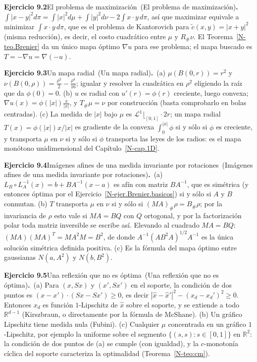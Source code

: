 \documentclass[11pt,a4paper]{amsart}
\newcommand{\R}{{\mathbb R}}
\newcommand{\LL}{{\mathcal L}}
\theoremstyle{remark}
\theoremstyle{definition}
\numberwithin{subsection}{section}
\numberwithin{equation}{section}
\newcommand{\ejlabel}[2]{\par\medskip\noindent\textbf{Ejercicio #1}\ifx\relax#2\relax\else\ (#2)\fi\textbf{.}\ }
\begin{document}
\ejlabel{9.2}{El problema de maximización}$\int|x-y|^2d\pi=\int|x|^2d\mu+\int|y|^2d\nu-2\int x\cdot y\,d\pi$, así que maximizar equivale a minimizar $\int x\cdot y\,d\pi$, que es el problema de Kantorovich para $\tilde c(x,y)=|x+y|^2$ (misma reducción), es decir, el costo cuadrático entre $\mu$ y $R_\#\nu$. El Teorema~\ref{N-teo.Brenier} da un único mapa óptimo $\nabla u$ para ese problema; el mapa buscado es $T=-\nabla u=\nabla(-u)$.

\ejlabel{9.3}{Un mapa radial}(a) $\mu(B(0,r))=r^2$ y $\nu(B(0,\rho))=\frac{\rho^2}2-\frac{\rho^4}{16}$; igualar y resolver la cuadrática en $\rho^2$ eligiendo la raíz que da $\phi(0)=0$. (b) $u$ es radial con $u'(r)=\phi(r)$ creciente, luego convexa; $\nabla u(x)=\phi(|x|)\frac x{|x|}$, y $T_\#\mu=\nu$ por construcción (basta comprobarlo en bolas centradas). (c) La medida de $|x|$ bajo $\mu$ es $\LL^1\lfloor_{[0,1]}\cdot 2r$; un mapa radial $T(x)=\phi(|x|)x/|x|$ es gradiente de la convexa $\int_0^{|x|}\phi$ si y sólo si $\phi$ es creciente, y transporta $\mu$ en $\nu$ si y sólo si $\phi$ transporta las leyes de los radios: es el mapa monótono unidimensional del Capítulo~\ref{N-cap.1D}.

\ejlabel{9.4}{Imágenes afines de una medida invariante por rotaciones}(a) $L_B\circ L_A^{-1}(x)=b+BA^{-1}(x-a)$ es afín con matriz $BA^{-1}$, que es simétrica (y entonces óptima por el Ejercicio~\ref{N-ejer.Brenier.basicos}) si y sólo si $A$ y $B$ conmutan. (b) $T$ transporta $\mu$ en $\nu$ si y sólo si $(MA)_\#\rho=B_\#\rho$; por la invariancia de $\rho$ esto vale si $MA=BQ$ con $Q$ ortogonal, y por la factorización polar toda matriz inversible se escribe así. Elevando al cuadrado $MA=BQ$: $(MA)(MA)^T=MA^2M=B^2$, de donde $A^{-1}(AB^2A)^{1/2}A^{-1}$ es la única solución simétrica definida positiva. (c) Es la fórmula del mapa óptimo entre gaussianas $N(a,A^2)$ y $N(b,B^2)$.

\ejlabel{9.5}{Una reflexión que no es óptima}(a) Para $(x,Sx)$ y $(x',Sx')$ en el soporte, la condición de dos puntos es $(x-x')\cdot(Sx-Sx')\ge0$, es decir $|\hat x-\hat x'|^2-(x_d-x_d')^2\ge0$. Entonces $x_d$ es función $1$-Lipschitz de $\hat x$ sobre el soporte, y se extiende a todo $\R^{d-1}$ (Kirszbraun, o directamente por la fórmula de McShane). (b) Un gráfico Lipschitz tiene medida nula (Fubini). (c) Cualquier $\mu$ concentrada en un gráfico $1$-Lipschitz, por ejemplo la uniforme sobre el segmento $\{(s,s):s\in[0,1]\}$ en $\R^2$: la condición de dos puntos de (a) se cumple (con igualdad), y la $c$-monotonía cíclica del soporte caracteriza la optimalidad (Teorema~\ref{N-teo:cm}).
\end{document}
